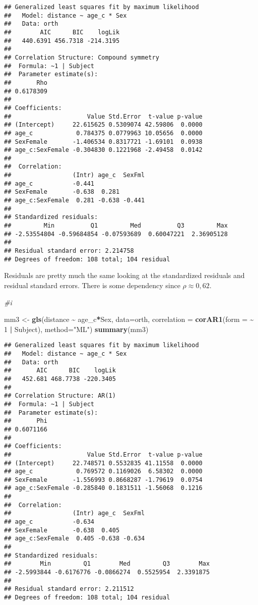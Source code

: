 \documentclass[
]{article}
\newenvironment{Shaded}{\begin{snugshade}}{\end{snugshade}}
\newcommand{\AttributeTok}[1]{\textcolor[rgb]{0.13,0.29,0.53}{#1}}
\newcommand{\CommentTok}[1]{\textcolor[rgb]{0.56,0.35,0.01}{\textit{#1}}}
\newcommand{\DecValTok}[1]{\textcolor[rgb]{0.00,0.00,0.81}{#1}}
\newcommand{\FunctionTok}[1]{\textcolor[rgb]{0.13,0.29,0.53}{\textbf{#1}}}
\newcommand{\NormalTok}[1]{#1}
\newcommand{\OtherTok}[1]{\textcolor[rgb]{0.56,0.35,0.01}{#1}}
\newcommand{\SpecialCharTok}[1]{\textcolor[rgb]{0.81,0.36,0.00}{\textbf{#1}}}
\newcommand{\StringTok}[1]{\textcolor[rgb]{0.31,0.60,0.02}{#1}}
\begin{document}
\begin{verbatim}
## Generalized least squares fit by maximum likelihood
##   Model: distance ~ age_c * Sex 
##   Data: orth 
##        AIC      BIC    logLik
##   440.6391 456.7318 -214.3195
## 
## Correlation Structure: Compound symmetry
##  Formula: ~1 | Subject 
##  Parameter estimate(s):
##       Rho 
## 0.6178309 
## 
## Coefficients:
##                     Value Std.Error  t-value p-value
## (Intercept)     22.615625 0.5309074 42.59806  0.0000
## age_c            0.784375 0.0779963 10.05656  0.0000
## SexFemale       -1.406534 0.8317721 -1.69101  0.0938
## age_c:SexFemale -0.304830 0.1221968 -2.49458  0.0142
## 
##  Correlation: 
##                 (Intr) age_c  SexFml
## age_c           -0.441              
## SexFemale       -0.638  0.281       
## age_c:SexFemale  0.281 -0.638 -0.441
## 
## Standardized residuals:
##         Min          Q1         Med          Q3         Max 
## -2.53554804 -0.59684854 -0.07593689  0.60047221  2.36905128 
## 
## Residual standard error: 2.214758 
## Degrees of freedom: 108 total; 104 residual
\end{verbatim}

Residuals are pretty much the same looking at the standardized residuals
and residual standard errors. There is some dependency since
\(\rho \approx 0,62\).

\begin{Shaded}
\begin{Highlighting}[]
\CommentTok{\#i}

\NormalTok{mm3 }\OtherTok{\textless{}{-}} \FunctionTok{gls}\NormalTok{(distance }\SpecialCharTok{\textasciitilde{}}\NormalTok{ age\_c}\SpecialCharTok{*}\NormalTok{Sex, }\AttributeTok{data=}\NormalTok{orth,}
           \AttributeTok{correlation =} \FunctionTok{corAR1}\NormalTok{(}\AttributeTok{form =} \SpecialCharTok{\textasciitilde{}} \DecValTok{1} \SpecialCharTok{|}\NormalTok{ Subject),}
           \AttributeTok{method=}\StringTok{"ML"}\NormalTok{)}
\FunctionTok{summary}\NormalTok{(mm3)}
\end{Highlighting}
\end{Shaded}

\begin{verbatim}
## Generalized least squares fit by maximum likelihood
##   Model: distance ~ age_c * Sex 
##   Data: orth 
##       AIC      BIC    logLik
##   452.681 468.7738 -220.3405
## 
## Correlation Structure: AR(1)
##  Formula: ~1 | Subject 
##  Parameter estimate(s):
##       Phi 
## 0.6071166 
## 
## Coefficients:
##                     Value Std.Error  t-value p-value
## (Intercept)     22.748571 0.5532835 41.11558  0.0000
## age_c            0.769572 0.1169026  6.58302  0.0000
## SexFemale       -1.556993 0.8668287 -1.79619  0.0754
## age_c:SexFemale -0.285840 0.1831511 -1.56068  0.1216
## 
##  Correlation: 
##                 (Intr) age_c  SexFml
## age_c           -0.634              
## SexFemale       -0.638  0.405       
## age_c:SexFemale  0.405 -0.638 -0.634
## 
## Standardized residuals:
##        Min         Q1        Med         Q3        Max 
## -2.5993844 -0.6176776 -0.0866274  0.5525954  2.3391875 
## 
## Residual standard error: 2.211512 
## Degrees of freedom: 108 total; 104 residual
\end{verbatim}
\end{document}
